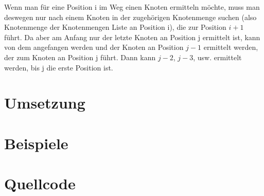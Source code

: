 \documentclass[a4paper,10pt,ngerman]{scrartcl}
\begin{document}
	Wenn man für eine Position i im Weg einen Knoten ermitteln möchte,
	muss man deswegen nur nach einem Knoten in der zugehörigen Knotenmenge suchen
	(also Knotenmenge der Knotenmengen Liste an Position i),
	die zur Position $i + 1$ führt.
	Da aber am Anfang nur der letzte Knoten an Position j ermittelt ist,
	kann von dem angefangen werden und der Knoten an Position $j - 1$ ermittelt werden,
	der zum Knoten an Position j führt.
	Dann kann $j - 2$, $j - 3$, usw. ermittelt werden,
	bis j die erste Position ist.


    \section{Umsetzung}\label{sec:umsetzung}


    \section{Beispiele}\label{sec:beispiele}


    \section{Quellcode}\label{sec:quellcode}\label{LastPage}
\end{document}
